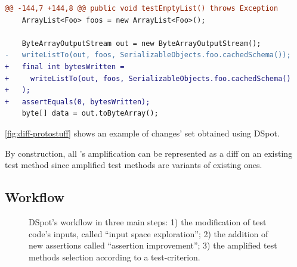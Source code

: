 
\begin{lstlisting}[language=diff,caption=Example of what \dspot produces: a diff to improve an existing test case.,label=fig:diff-protostuff]
@@ -144,7 +144,8 @@ public void testEmptyList() throws Exception
    ArrayList<Foo> foos = new ArrayList<Foo>();

    ByteArrayOutputStream out = new ByteArrayOutputStream();
-   writeListTo(out, foos, SerializableObjects.foo.cachedSchema());
+   final int bytesWritten =
+     writeListTo(out, foos, SerializableObjects.foo.cachedSchema()
+   );
+   assertEquals(0, bytesWritten);
    byte[] data = out.toByteArray();
\end{lstlisting}
\autoref{fig:diff-protostuff} shows an example of changes' set obtained using DSpot.

By construction, all \dspot's amplification can be represented as a diff on an existing test method since amplified test methods are variants of existing ones.

\subsection{Workflow}
\label{subsec:dspot:overview:workflow}

\begin{figure}[h]
	\caption{DSpot's workflow in three main steps: 
		1) the modification of test code's inputs, called ``input space exploration''; 
		2) the addition of new assertions called ``assertion improvement''; 
		3) the amplified test methods selection according to a test-criterion.
	}
	\label{fig:dspot-workflow}
	\centering
\end{figure}


